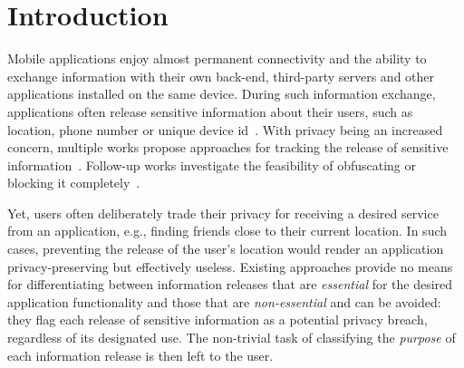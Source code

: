 \section{Introduction}
\label{sec:intro} 
Mobile applications enjoy almost permanent connectivity and the ability to exchange information with their own back-end, third-party servers and other applications installed on the same device. 
During such information exchange, applications often release sensitive information about their users, such as location, phone number or unique device id~\cite{Enck:Gilbert:Chun:Cox:Jung:McDaniel:Sheth:OSDI10, Egele:Kruegel:Kirda:Vign:NDSS11,Tripp:Rubin:SEC14}. 
With privacy being an increased concern, multiple works propose approaches for tracking the release of 
sensitive information~\cite{Enck:Gilbert:Chun:Cox:Jung:McDaniel:Sheth:OSDI10,Egele:Kruegel:Kirda:Vign:NDSS11,Arzt:Rasthofer:Fritz:Bodden:Bartel:Klein:Traon:Octeau:McDaniel:PLDI14, Tripp:Rubin:SEC14,Gordon:Kim:Perkins:Gilham:Nguyen:Rinard:NDSS15}. Follow-up works investigate the
feasibility of obfuscating or blocking it completely~\cite{Hornyack:Han:Jung:Schechter:Wetherall:CCS11}.

Yet, users often deliberately trade their privacy for receiving a desired service from an application, 
e.g., finding friends close to their current location. 
In such cases, preventing the release of the user's location would render an application privacy-preserving but effectively useless. 
Existing approaches provide no means for differentiating between information releases that are \emph{essential} for the desired application functionality and those that are \emph{non-essential} and can be avoided: 
they flag each release of sensitive information as a potential privacy breach, regardless of its designated use.
The non-trivial task of classifying the \emph{purpose} of each information release is then left to the user. 


